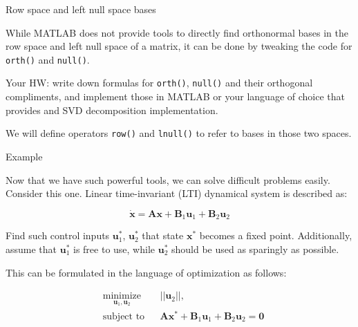 \documentclass{beamer}
\begin{document}
\begin{frame}{Row space and left null space bases}
\begin{flushleft}

While MATLAB does not provide tools to directly find orthonormal bases in the row space and left null space of a matrix, it can be done by tweaking the code for \texttt{orth()} and \texttt{null()}. 

\bigskip

Your HW: write down formulas for \texttt{orth()}, \texttt{null()} and their orthogonal compliments, and implement those in MATLAB or your language of choice that provides and SVD decomposition implementation.

\bigskip

We will define operators \texttt{row()} and \texttt{lnull()} to refer to bases in those two spaces.

\end{flushleft}
\end{frame}



\begin{frame}{Example}
\begin{flushleft}

Now that we have such powerful tools, we can solve difficult problems easily. Consider this one. Linear time-invariant (LTI) dynamical system is described as:

\begin{equation}
    \dot{\mathbf{x}} = \mathbf{A} \mathbf{x} + \mathbf{B}_1 \mathbf{u}_1 + \mathbf{B}_2 \mathbf{u}_2
\end{equation}

Find such control inputs $\mathbf{u}^*_1$, $\mathbf{u}^*_2$ that state $\mathbf{x}^*$ becomes a fixed point. Additionally, assume that $\mathbf{u}^*_1$ is free to use, while $\mathbf{u}^*_2$ should be used as sparingly as possible.

\bigskip

This can be formulated in the language of optimization as follows:

\begin{equation}
\begin{aligned}
& \underset{\mathbf{u}_1, \mathbf{u}_2}{\text{minimize}}
& & || \mathbf{u}_2 ||, \\
& \text{subject to}
& & \mathbf{A} \mathbf{x}^* + \mathbf{B}_1 \mathbf{u}_1 + \mathbf{B}_2 \mathbf{u}_2 = \mathbf{0}
\end{aligned}
\end{equation}

\end{flushleft}
\end{frame}
\end{document}
